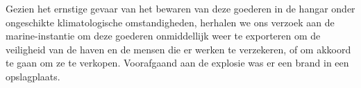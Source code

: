 Gezien het ernstige gevaar van het bewaren van deze goederen in de hangar onder ongeschikte klimatologische omstandigheden, herhalen we ons verzoek aan de marine-instantie om deze goederen onmiddellijk weer te exporteren om de veiligheid van de haven en de mensen die er werken te verzekeren, of om akkoord te gaan om ze te verkopen.
Voorafgaand aan de explosie was er een brand in een opslagplaats. 

 
\cite{hrw03082021investigateBeirutBlast}
 
\cite{souaibyElHussein112020Beirutstory}
 
\cite{ifrc2020chemicalexplosionBeirutPort}


 


